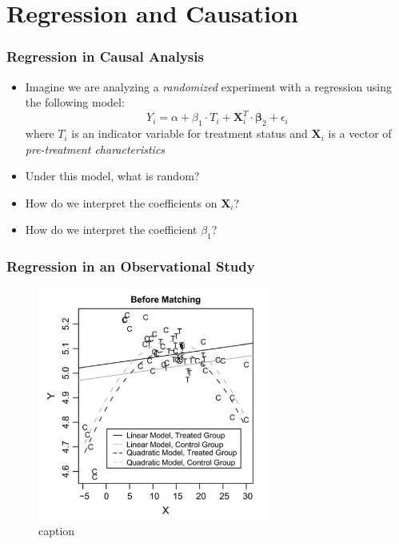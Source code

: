 \documentclass{beamer}
\begin{document}
\section{Regression and Causation}
\begin{frame}[t]\frametitle{Regression in  Causal Analysis}
	\begin{itemize}
		\item Imagine we are analyzing a \emph{randomized} experiment with a regression using the following model:
		$$Y_i=\alpha + \beta_1 \cdot T_i + \mathbf{X}^T_i\cdot \mathbf{\beta}_2+\epsilon_i$$
		where $T_i$ is an indicator variable for treatment status and $\mathbf{X}_i$ is a vector of \emph{pre-treatment characteristics}
		\item<+-> Under this model, what is random?  
		\item<+-> How do we interpret the coefficients on $\mathbf{X}_i$?
		\item<+-> How do we interpret the coefficient  $\beta_1$? 
		
	\end{itemize}
\end{frame}

\begin{frame}[t]\frametitle{Regression in an Observational Study}
	\begin{figure}[htbp]
		\centering
			\includegraphics[height=3in]{model_dependence.png}
		\caption{caption}
		\label{fig:model_dependence}
	\end{figure}
	
\end{frame}
\end{document}
